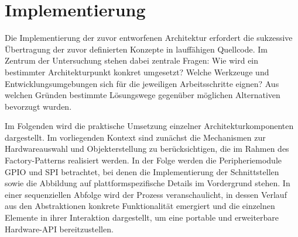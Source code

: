 \section{Implementierung}
Die Implementierung der zuvor entworfenen Architektur erfordert die sukzessive Übertragung der zuvor definierten Konzepte in lauffähigen Quellcode. 
Im Zentrum der Untersuchung stehen dabei zentrale Fragen: 
Wie wird ein bestimmter Architekturpunkt konkret umgesetzt?  
Welche Werkzeuge und Entwicklungsumgebungen sich für die jeweiligen Arbeitsschritte eignen? 
Aus welchen Gründen bestimmte Lösungswege gegenüber möglichen Alternativen bevorzugt wurden.


Im Folgenden wird die praktische Umsetzung einzelner Architekturkomponenten dargestellt.
 Im vorliegenden Kontext sind zunächst die Mechanismen zur Hardwareauswahl und Objekterstellung zu berücksichtigen, die im Rahmen des Factory-Patterns realisiert werden. 
 In der Folge werden die Peripheriemodule GPIO und SPI betrachtet, bei denen die Implementierung der Schnittstellen sowie die Abbildung auf plattformspezifische Details im Vordergrund stehen. 
 In einer sequenziellen Abfolge wird der Prozess veranschaulicht, in dessen Verlauf aus den Abstraktionen konkrete Funktionalität emergiert und die einzelnen Elemente in ihrer Interaktion dargestellt, um eine portable und erweiterbare Hardware-API bereitzustellen.
 
%
%
%
%
%

